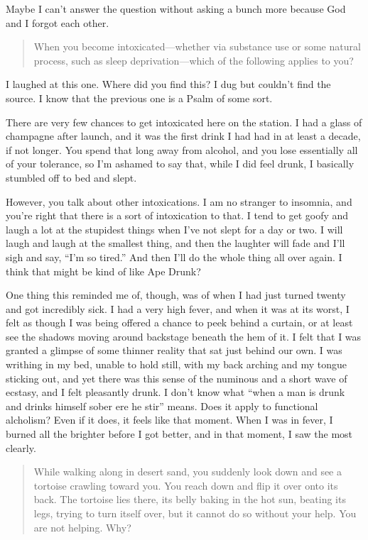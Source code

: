 Maybe I can't answer the question without asking a bunch more because God and I forgot each other.

\begin{quote}
When you become intoxicated---whether via substance use or some natural process, such as sleep deprivation---which of the following applies to you?
\end{quote}

\noindent I laughed at this one. Where did you find this? I dug but couldn't find the source. I know that the previous one is a Psalm of some sort.

There are very few chances to get intoxicated here on the station. I had a glass of champagne after launch, and it was the first drink I had had in at least a decade, if not longer. You spend that long away from alcohol, and you lose essentially all of your tolerance, so I'm ashamed to say that, while I did feel drunk, I basically stumbled off to bed and slept.

However, you talk about other intoxications. I am no stranger to insomnia, and you're right that there is a sort of intoxication to that. I tend to get goofy and laugh a lot at the stupidest things when I've not slept for a day or two. I will laugh and laugh at the smallest thing, and then the laughter will fade and I'll sigh and say, ``I'm so tired.'' And then I'll do the whole thing all over again. I think that might be kind of like Ape Drunk?

One thing this reminded me of, though, was of when I had just turned twenty and got incredibly sick. I had a very high fever, and when it was at its worst, I felt as though I was being offered a chance to peek behind a curtain, or at least see the shadows moving around backstage beneath the hem of it. I felt that I was granted a glimpse of some thinner reality that sat just behind our own. I was writhing in my bed, unable to hold still, with my back arching and my tongue sticking out, and yet there was this sense of the numinous and a short wave of ecstasy, and I felt pleasantly drunk. I don't know what ``when a man is drunk and drinks himself sober ere he stir'' means. Does it apply to functional alcholism? Even if it does, it feels like that moment. When I was in fever, I burned all the brighter before I got better, and in that moment, I saw the most clearly.

\begin{quote}
While walking along in desert sand, you suddenly look down and see a tortoise crawling toward you. You reach down and flip it over onto its back. The tortoise lies there, its belly baking in the hot sun, beating its legs, trying to turn itself over, but it cannot do so without your help. You are not helping. Why?
\end{quote}

